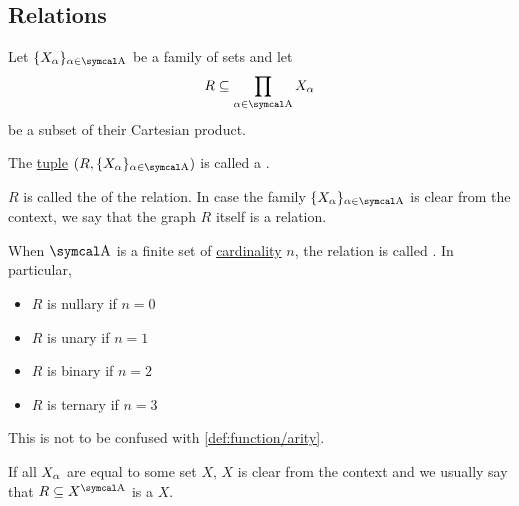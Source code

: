 \subsection{Relations}\label{subsec:relations}

\begin{definition}\label{def:relation}
  Let \( \{ X_\al \}_{\al \in \CA} \) be a family of sets and let
  \begin{equation*}
    R \subseteq \prod_{\al \in \CA} X_\al
  \end{equation*}
  be a subset of their Cartesian product.

  The \hyperref[def:cartesian_product]{tuple} \( (R,  \{ X_\al \}_{\al \in \CA}) \) is called a .

  \begin{defenum}
     \( R \) is called the  of the relation. In case the family \( \{ X_\al \}_{\al \in \CA} \) is clear from the context, we say that the graph \( R \) itself is a relation.

     When \( \CA \) is a finite set of \hyperref[remark:cardinals]{cardinality} \( n \), the relation is called . In particular,
    \begin{itemize}
      \item \( R \) is nullary if \( n = 0 \)
      \item \( R \) is unary if \( n = 1 \)
      \item \( R \) is binary if \( n = 2 \)
      \item \( R \) is ternary if \( n = 3 \)
    \end{itemize}

    This is not to be confused with \cref{def:function/arity}.

     If all \( X_\alpha \) are equal to some set \( X \), \( X \) is clear from the context and we usually say that \( R \subseteq X^{\CA} \) is a  \( X \).
  \end{defenum}
\end{definition}

